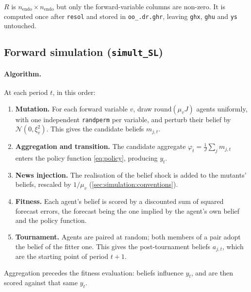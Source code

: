\documentclass[11pt,a4paper]{article}
\newcommand{\field}[1]{\texttt{#1}}
\begin{document}
$R$ is $n_{\text{endo}} \times n_{\text{endo}}$ but only the forward-variable
columns are non-zero. It is computed once after \texttt{resol} and stored in
\field{oo\_.dr.ghr}, leaving \field{ghx}, \field{ghu} and \field{ys}
untouched.


\subsection{Forward simulation (\texttt{simult\_SL})}
\label{sec:simulation:simult_SL}

\paragraph{Algorithm.} At each period $t$, in this order:

\begin{enumerate}[leftmargin=2em]
\item \textbf{Mutation.} For each forward variable $v$, draw
      $\mathrm{round}(\mu_v J)$ agents uniformly, with one independent
      \texttt{randperm} per variable, and perturb their belief by
      $\mathcal{N}(0, \xi_v^2)$. This gives the candidate beliefs $m_{j,t}$.
\item \textbf{Aggregation and transition.} The candidate aggregate
      $\varphi_t = \frac{1}{J}\sum_j m_{j,t}$ enters the policy function
      \eqref{eq:policy}, producing $y_t$.
\item \textbf{News injection.} The realisation of the belief shock is added to
      the mutants' beliefs, rescaled by $1/\mu_v$
      (\cref{sec:simulation:conventions}).
\item \textbf{Fitness.} Each agent's belief is scored by a discounted sum of
      squared forecast errors, the forecast being the one implied by the agent's
      own belief and the policy function.
\item \textbf{Tournament.} Agents are paired at random; both members of a pair
      adopt the belief of the fitter one. This gives the post-tournament
      beliefs $a_{j,t}$, which are the starting point of period $t+1$.
\end{enumerate}

Aggregation precedes the fitness evaluation: beliefs influence $y_t$, and are
then scored against that same $y_t$.
\end{document}
